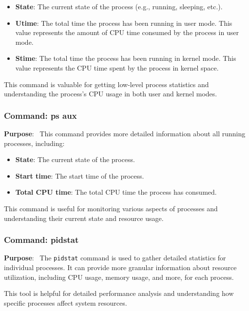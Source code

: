 \documentclass[12pt]{article}
\begin{document}
\begin{itemize}
    \item \textbf{State}: The current state of the process (e.g., running, sleeping, etc.).
    \item \textbf{Utime}: The total time the process has been running in user mode. This value represents the amount of CPU time consumed by the process in user mode.
    \item \textbf{Stime}: The total time the process has been running in kernel mode. This value represents the CPU time spent by the process in kernel space.
\end{itemize}

This command is valuable for getting low-level process statistics and understanding the process's CPU usage in both user and kernel modes.

\subsubsection{Command: ps aux}

\textbf{Purpose}: \
This command provides more detailed information about all running processes, including:

\begin{itemize}
    \item \textbf{State}: The current state of the process.
    \item \textbf{Start time}: The start time of the process.
    \item \textbf{Total CPU time}: The total CPU time the process has consumed.
\end{itemize}

This command is useful for monitoring various aspects of processes and understanding their current state and resource usage.

\subsubsection{Command: pidstat}

\textbf{Purpose}: \
The \texttt{pidstat} command is used to gather detailed statistics for individual processes. It can provide more granular information about resource utilization, including CPU usage, memory usage, and more, for each process.

This tool is helpful for detailed performance analysis and understanding how specific processes affect system resources.
\end{document}
